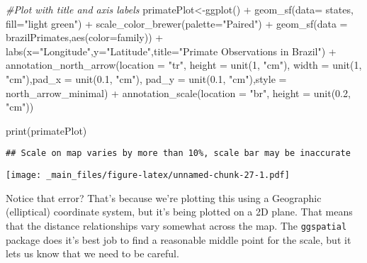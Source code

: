 \documentclass[
]{book}
\newenvironment{Shaded}{\begin{snugshade}}{\end{snugshade}}
\newcommand{\AttributeTok}[1]{\textcolor[rgb]{0.77,0.63,0.00}{#1}}
\newcommand{\CommentTok}[1]{\textcolor[rgb]{0.56,0.35,0.01}{\textit{#1}}}
\newcommand{\DecValTok}[1]{\textcolor[rgb]{0.00,0.00,0.81}{#1}}
\newcommand{\FloatTok}[1]{\textcolor[rgb]{0.00,0.00,0.81}{#1}}
\newcommand{\FunctionTok}[1]{\textcolor[rgb]{0.00,0.00,0.00}{#1}}
\newcommand{\NormalTok}[1]{#1}
\newcommand{\OtherTok}[1]{\textcolor[rgb]{0.56,0.35,0.01}{#1}}
\newcommand{\SpecialCharTok}[1]{\textcolor[rgb]{0.00,0.00,0.00}{#1}}
\newcommand{\StringTok}[1]{\textcolor[rgb]{0.31,0.60,0.02}{#1}}
\begin{document}
\begin{Shaded}
\begin{Highlighting}[]
\CommentTok{\#Plot with title and axis labels}
\NormalTok{primatePlot}\OtherTok{\textless{}{-}}\FunctionTok{ggplot}\NormalTok{() }\SpecialCharTok{+} 
  \FunctionTok{geom\_sf}\NormalTok{(}\AttributeTok{data=}\NormalTok{ states, }\AttributeTok{fill=}\StringTok{"light green"}\NormalTok{) }\SpecialCharTok{+}
  \FunctionTok{scale\_color\_brewer}\NormalTok{(}\AttributeTok{palette=}\StringTok{"Paired"}\NormalTok{) }\SpecialCharTok{+}
  \FunctionTok{geom\_sf}\NormalTok{(}\AttributeTok{data =}\NormalTok{ brazilPrimates,}\FunctionTok{aes}\NormalTok{(}\AttributeTok{color=}\NormalTok{family)) }\SpecialCharTok{+}
  \FunctionTok{labs}\NormalTok{(}\AttributeTok{x=}\StringTok{"Longitude"}\NormalTok{,}\AttributeTok{y=}\StringTok{"Latitude"}\NormalTok{,}\AttributeTok{title=}\StringTok{"Primate Observations in Brazil"}\NormalTok{)  }\SpecialCharTok{+}
    \FunctionTok{annotation\_north\_arrow}\NormalTok{(}\AttributeTok{location =} \StringTok{"tr"}\NormalTok{,  }\AttributeTok{height =} \FunctionTok{unit}\NormalTok{(}\DecValTok{1}\NormalTok{, }\StringTok{"cm"}\NormalTok{), }\AttributeTok{width =} \FunctionTok{unit}\NormalTok{(}\DecValTok{1}\NormalTok{, }\StringTok{"cm"}\NormalTok{),}\AttributeTok{pad\_x =} \FunctionTok{unit}\NormalTok{(}\FloatTok{0.1}\NormalTok{, }\StringTok{"cm"}\NormalTok{), }\AttributeTok{pad\_y =} \FunctionTok{unit}\NormalTok{(}\FloatTok{0.1}\NormalTok{, }\StringTok{"cm"}\NormalTok{),}\AttributeTok{style =}\NormalTok{ north\_arrow\_minimal) }\SpecialCharTok{+}
\FunctionTok{annotation\_scale}\NormalTok{(}\AttributeTok{location =} \StringTok{"br"}\NormalTok{, }\AttributeTok{height =} \FunctionTok{unit}\NormalTok{(}\FloatTok{0.2}\NormalTok{, }\StringTok{"cm"}\NormalTok{)) }


\FunctionTok{print}\NormalTok{(primatePlot)}
\end{Highlighting}
\end{Shaded}

\begin{verbatim}
## Scale on map varies by more than 10%, scale bar may be inaccurate
\end{verbatim}

\texttt{[image: \_main\_files/figure-latex/unnamed-chunk-27-1.pdf]}

Notice that error? That's because we're plotting this using a Geographic (elliptical) coordinate system, but it's being plotted on a 2D plane. That means that the distance relationships vary somewhat across the map. The \texttt{ggspatial} package does it's best job to find a reasonable middle point for the scale, but it lets us know that we need to be careful.
\end{document}
